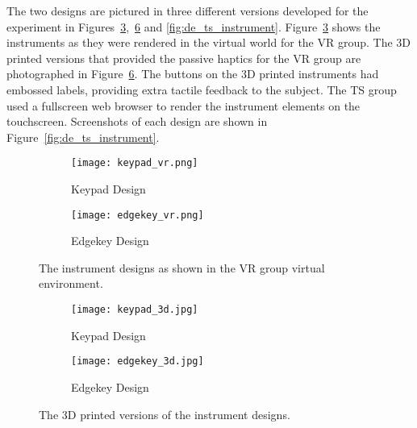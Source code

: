 The two designs are pictured in three different versions developed for the experiment in Figures~\ref{fig:de_vr_instrument},~\ref{fig:de_3d_instrument} and \ref{fig:de_ts_instrument}.
Figure~\ref{fig:de_vr_instrument} shows the instruments as they were rendered in the virtual world for the VR group.
The 3D printed versions that provided the passive haptics for the VR group are photographed in Figure~\ref{fig:de_3d_instrument}.
The buttons on the 3D printed instruments had embossed labels, providing extra tactile feedback to the subject.
The TS group used a fullscreen web browser to render the instrument elements on the touchscreen.
Screenshots of each design are shown in Figure~\ref{fig:de_ts_instrument}.

\begin{figure}
    \centering
    \begin{subfigure}[t]{0.95\linewidth}
        \centering
        \texttt{[image: keypad\_vr.png]}
        \caption{Keypad Design}
        \label{fig:de_vr_instrument:keypad}
    \end{subfigure}
    \begin{subfigure}[t]{0.95\linewidth}
        \centering
        \texttt{[image: edgekey\_vr.png]}
        \caption{Edgekey Design}
        \label{fig:de_vr_instrument:edgekey}
    \end{subfigure}
    \caption{The instrument designs as shown in the VR group virtual environment.}
    \label{fig:de_vr_instrument}
\end{figure}

\begin{figure}
    \centering
    \begin{subfigure}[t]{0.95\linewidth}
        \centering
        \texttt{[image: keypad\_3d.jpg]}
        \caption{Keypad Design}
        \label{fig:de_3d_instrument:keypad}
    \end{subfigure}
    \begin{subfigure}[t]{0.95\linewidth}
        \centering
        \texttt{[image: edgekey\_3d.jpg]}
        \caption{Edgekey Design}
        \label{fig:de_3d_instrument:edgekey}
    \end{subfigure}
    \caption{The 3D printed versions of the instrument designs.}
    \label{fig:de_3d_instrument}
\end{figure}

